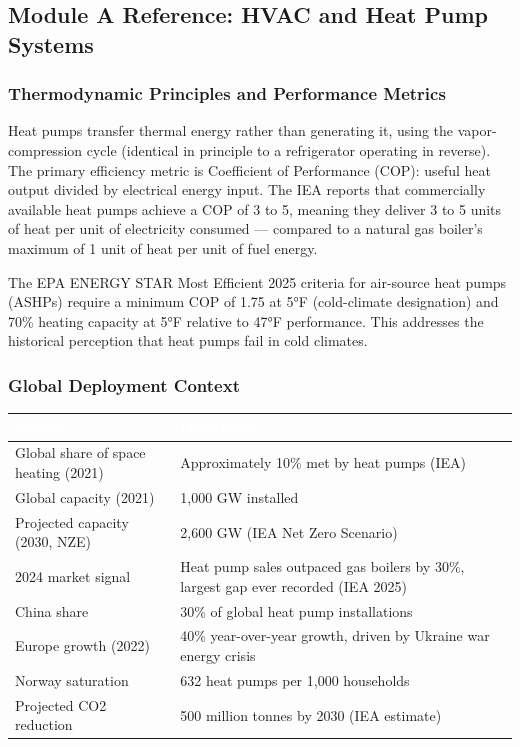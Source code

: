 \documentclass[11pt,letterpaper]{article}
\newcommand{\tableheader}[1]{\textbf{\sffamily\textcolor{white}{#1}}}
\begin{document}
\subsection{Module A Reference: HVAC and Heat Pump Systems}

\subsubsection{Thermodynamic Principles and Performance Metrics}
Heat pumps transfer thermal energy rather than generating it, using the vapor-compression cycle (identical in principle to a refrigerator operating in reverse). The primary efficiency metric is Coefficient of Performance (COP): useful heat output divided by electrical energy input. The IEA reports that commercially available heat pumps achieve a COP of 3 to 5, meaning they deliver 3 to 5 units of heat per unit of electricity consumed — compared to a natural gas boiler's maximum of 1 unit of heat per unit of fuel energy.

The EPA ENERGY STAR Most Efficient 2025 criteria for air-source heat pumps (ASHPs) require a minimum COP of 1.75 at 5°F (cold-climate designation) and 70\% heating capacity at 5°F relative to 47°F performance. This addresses the historical perception that heat pumps fail in cold climates.

\subsubsection{Global Deployment Context}
\begin{center}
\begin{tabularx}{\textwidth}{L{3.5cm}X}
\toprule
{}
\tableheader{Metric} & \tableheader{Data Point} \\
\midrule
Global share of space heating (2021) & Approximately 10\% met by heat pumps (IEA) \\
Global capacity (2021) & 1,000 GW installed \\
Projected capacity (2030, NZE) & 2,600 GW (IEA Net Zero Scenario) \\
2024 market signal & Heat pump sales outpaced gas boilers by 30\%, largest gap ever recorded (IEA 2025) \\
China share & 30\% of global heat pump installations \\
Europe growth (2022) & 40\% year-over-year growth, driven by Ukraine war energy crisis \\
Norway saturation & 632 heat pumps per 1,000 households \\
Projected CO2 reduction & 500 million tonnes by 2030 (IEA estimate) \\
\bottomrule
\end{tabularx}
\end{center}
\end{document}
